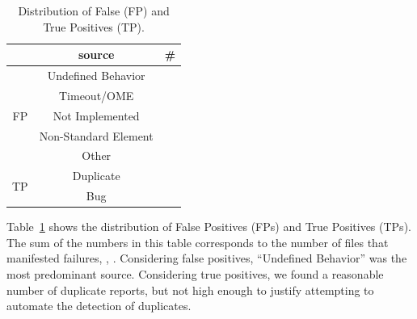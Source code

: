 \documentclass[smallextended]{svjour3}
\begin{document}
\begin{table}[h!]
  \centering
  \caption{\label{fig:falsepositives}\label{fig:truepositives}\label{fig:piecharts-transplantation}Distribution
    of False (FP) and True Positives (TP).}
  \renewcommand*{\arraystretch}{0.9}
  \begin{tabular}{ccr}
    \toprule
    & source &  \#\\
    \midrule
    \multirow{5}{*}{FP} & Undefined Behavior & \noTransUndefined{} \\
    & Timeout/OME & \noTransTimeout{} \\
    & Not Implemented & \noTransNotImplemented{} \\
    & Non-Standard Element & \noTransNonStandard{} \\
    & Other & \noTransOther{} \\
    \midrule
    \multirow{2}{*}{TP} & Duplicate & \noTransTPDuplicated{} \\
    & Bug & \noTransTPBugs{} \\
    \bottomrule
  \end{tabular}
\end{table}

Table~\ref{fig:piecharts-transplantation} shows the distribution of
False Positives (FPs) and True Positives (TPs). The sum of the numbers
in this table corresponds to the number of files that manifested
failures, \ie{}, \failuresTestTransDistictFiles{}. Considering false
positives, ``Undefined Behavior'' was the most predominant
source. Considering true positives, we found a reasonable number of
duplicate reports, but not high enough to justify attempting to
automate the detection of duplicates.


\end{document}
